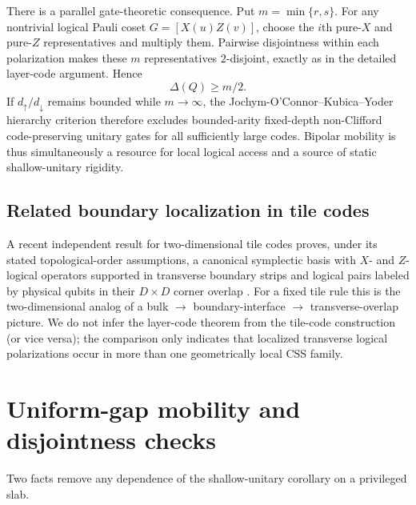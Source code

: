 \documentclass[aps,prx,reprint,superscriptaddress,nofootinbib,floatfix,longbibliography]{revtex4-2}
\theoremstyle{definition}
\begin{document}
There is a parallel gate-theoretic consequence.  Put $m=\min\{r,s\}$.  For
any nontrivial logical Pauli coset $G=[X(u)Z(v)]$, choose the $i$th pure-$X$
and pure-$Z$ representatives and multiply them.  Pairwise disjointness within
each polarization makes these $m$ representatives $2$-disjoint, exactly as
in the detailed layer-code argument.  Hence
\begin{equation}
 \Delta(Q)\ge m/2. \tag{S32}
\end{equation}
If $d_\uparrow/d_\downarrow$ remains bounded while $m\to\infty$, the
Jochym-O'Connor--Kubica--Yoder hierarchy criterion therefore excludes
bounded-arity fixed-depth non-Clifford code-preserving unitary gates for all
sufficiently large codes.  Bipolar mobility is thus simultaneously a
resource for local logical access and a source of static shallow-unitary
rigidity.

\subsection{Related boundary localization in tile codes}
A recent independent result for two-dimensional tile codes proves, under its
stated topological-order assumptions, a canonical symplectic basis with
$X$- and $Z$-logical operators supported in transverse boundary strips and
logical pairs labeled by physical qubits in their $D\times D$ corner overlap
\cite{BreuckmannTileLogical2026}.  For a fixed tile rule this is the two-dimensional
analog of a bulk $\to$ boundary-interface $\to$ transverse-overlap picture.
We do not infer the layer-code theorem from the tile-code construction (or
vice versa); the comparison only indicates that localized transverse logical
polarizations occur in more than one geometrically local CSS family.


\section{Uniform-gap mobility and disjointness checks}
\label{sec:supp-disjointness}
Two facts remove any dependence of the shallow-unitary corollary on a privileged slab.
\end{document}
